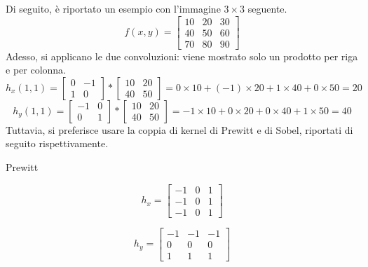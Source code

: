 Di seguito, è riportato un esempio con l'immagine $3 \times 3$ seguente.
\begin{equation*}
    f(x,y)=\begin{bmatrix}
        10 & 20 & 30\\
        40 & 50 & 60\\
        70 & 80 & 90
    \end{bmatrix}
\end{equation*}
Adesso, si applicano le due convoluzioni: viene mostrato solo un prodotto per riga e per colonna.
\begin{equation*}
    h_x(1,1)=\begin{bmatrix}
        0 & -1 \\
        1 & 0
    \end{bmatrix}*\begin{bmatrix}
        10 & 20 \\
        40 & 50
    \end{bmatrix}=0 \times 10 + (-1) \times 20 + 1 \times 40 + 0 \times 50 = 20
\end{equation*}
\begin{equation*}
    h_y(1,1)=\begin{bmatrix}
        -1 & 0 \\
        0 & 1
    \end{bmatrix}*\begin{bmatrix}
        10 & 20 \\
        40 & 50
    \end{bmatrix}= -1 \times 10 + 0 \times 20 + 0 \times 40 + 1 \times 50 = 40
\end{equation*}
Tuttavia, si preferisce usare la coppia di kernel di Prewitt e di Sobel, riportati di seguito rispettivamente.
\begin{center}
\begin{minipage}{0.11\textwidth} %
    \centering
    Prewitt
\end{minipage}
\hfill
\begin{minipage}{0.31\textwidth} %
    \centering
    \begin{equation*}
    h_x=\begin{bmatrix}
        -1 & 0 & 1\\
        -1 & 0 & 1\\
        -1 & 0 & 1
    \end{bmatrix}
\end{equation*}
\end{minipage}
\hfill %
\begin{minipage}{0.31\textwidth} %
    \centering
    \begin{equation*}
    h_y=\begin{bmatrix}
        -1 & -1 & -1\\
        0 & 0 & 0\\
        1 & 1 & 1
    \end{bmatrix}
\end{equation*}
\end{minipage}
\end{center}
